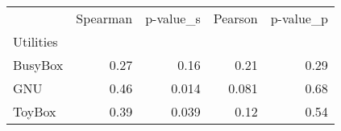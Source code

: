 \begin{tabular}{lrrrr}
\toprule
 & Spearman & p-value_s & Pearson & p-value_p \\
Utilities &  &  &  &  \\
\midrule
BusyBox & 0.27 & 0.16 & 0.21 & 0.29 \\
GNU & 0.46 & 0.014 & 0.081 & 0.68 \\
ToyBox & 0.39 & 0.039 & 0.12 & 0.54 \\
\bottomrule
\end{tabular}
